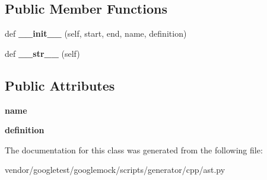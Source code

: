 \subsection*{Public Member Functions}
\begin{DoxyCompactItemize}
\item 
def {\bfseries \+\_\+\+\_\+init\+\_\+\+\_\+} (self, start, end, name, definition)\hypertarget{classcpp_1_1ast_1_1Define_ae9af61866e010a863ba9f8818ec8924c}{}\label{classcpp_1_1ast_1_1Define_ae9af61866e010a863ba9f8818ec8924c}

\item 
def {\bfseries \+\_\+\+\_\+str\+\_\+\+\_\+} (self)\hypertarget{classcpp_1_1ast_1_1Define_aa89732914b19901c8d291e11f34bb627}{}\label{classcpp_1_1ast_1_1Define_aa89732914b19901c8d291e11f34bb627}

\end{DoxyCompactItemize}
\subsection*{Public Attributes}
\begin{DoxyCompactItemize}
\item 
{\bfseries name}\hypertarget{classcpp_1_1ast_1_1Define_a8879216f09e88f79d7baa49bcfa10ebd}{}\label{classcpp_1_1ast_1_1Define_a8879216f09e88f79d7baa49bcfa10ebd}

\item 
{\bfseries definition}\hypertarget{classcpp_1_1ast_1_1Define_a0c636652dfeb2f15e62793afea1153c9}{}\label{classcpp_1_1ast_1_1Define_a0c636652dfeb2f15e62793afea1153c9}

\end{DoxyCompactItemize}


The documentation for this class was generated from the following file\+:\begin{DoxyCompactItemize}
\item 
vendor/googletest/googlemock/scripts/generator/cpp/ast.\+py\end{DoxyCompactItemize}

